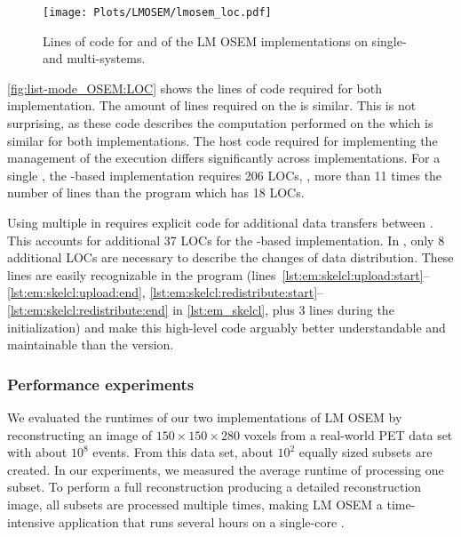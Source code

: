 \begin{figure}
  \centering
  \texttt{[image: Plots/LMOSEM/lmosem\_loc.pdf]}
  \caption[Lines of code of the LM OSEM implementations.]%
          {Lines of code for \CPU and \GPU of the LM OSEM implementations on single- and multi-\GPU systems.}
  \label{fig:list-mode_OSEM:LOC}
\end{figure}

\autoref{fig:list-mode_OSEM:LOC} shows the lines of code required for both implementation.
The amount of lines required on the \GPU is similar.
This is not surprising, as these code describes the computation performed on the \GPU which is similar for both implementations.
The host code required for implementing the management of the \GPU execution differs significantly across implementations.
For a single \GPU, the \OpenCL-based implementation requires 206 LOCs, \ie, more than 11 times the number of lines than the \SkelCL program which has 18 LOCs.

Using multiple \GPUs in \OpenCL requires explicit code for additional data transfers between \GPUs.
This accounts for additional 37 LOCs for the \OpenCL-based implementation.
In \SkelCL, only 8 additional LOCs are necessary to describe the changes of data distribution.
These lines are easily recognizable in the \SkelCL program (lines~\ref{lst:em:skelcl:upload:start}--\ref{lst:em:skelcl:upload:end}, \ref{lst:em:skelcl:redistribute:start}--\ref{lst:em:skelcl:redistribute:end} in \autoref{lst:em_skelcl}, plus 3 lines during the initialization) and make this high-level code arguably better understandable and maintainable than the \OpenCL version.













\subsubsection*{Performance experiments}
We evaluated the runtimes of our two implementations of LM OSEM by reconstructing an image of $150\times 150\times 280$ voxels from a real-world PET data set with about $10^8$ events.
From this data set, about $10^2$ equally sized subsets are created.
In our experiments, we measured the average runtime of processing one subset.
To perform a full reconstruction producing a detailed reconstruction image, all subsets are processed multiple times, making LM OSEM a time-intensive application that runs several hours on a single-core \CPU.

